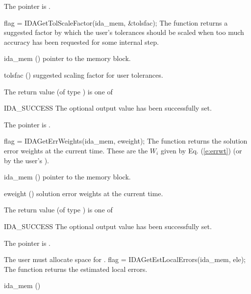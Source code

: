 {{\begin{args}
  \item[\Id{IDA\_MEM\_NULL}]
    The  pointer is .
  \end{args}
}
{}
{
  flag = IDAGetTolScaleFactor(ida\_mem, \&tolsfac);
}
{
  The function  returns a
  suggested factor by which the user's tolerances 
  should be scaled when too much accuracy has been 
  requested for some internal step.
}
{
  \begin{args}[tolsfac]
  \item[ida\_mem] ()
    pointer to the {\idas} memory block.
  \item[tolsfac] ()
    suggested scaling factor for user tolerances.
  \end{args}
}
{
  The return value  (of type ) is one of
  \begin{args}
  \item[IDA\_SUCCESS] 
    The optional output value has been successfully set.
  \item[\Id{IDA\_MEM\_NULL}]
    The  pointer is .
  \end{args}
}
{}
{
  flag = IDAGetErrWeights(ida\_mem, eweight);
}
{
  The function  returns the solution error weights 
  at the current time. These are the $W_i$ given by Eq. (\ref{e:errwt})
  (or by the user's ).
}
{
  \begin{args}[eweight]
  \item[ida\_mem] ()
    pointer to the {\idas} memory block.
  \item[eweight] ()
    solution error weights at the current time.
  \end{args}
}
{
  The return value  (of type ) is one of
  \begin{args}
  \item[IDA\_SUCCESS] 
    The optional output value has been successfully set.
  \item[\Id{IDA\_MEM\_NULL}]
    The  pointer is .
  \end{args}
}
{
  {\warn}The user must allocate space for .
}
{
  flag = IDAGetEstLocalErrors(ida\_mem, ele);
}
{
  The function  returns the estimated local errors.
}
{
  \begin{args}
  \item[ida\_mem] ()

\end{args}}}
